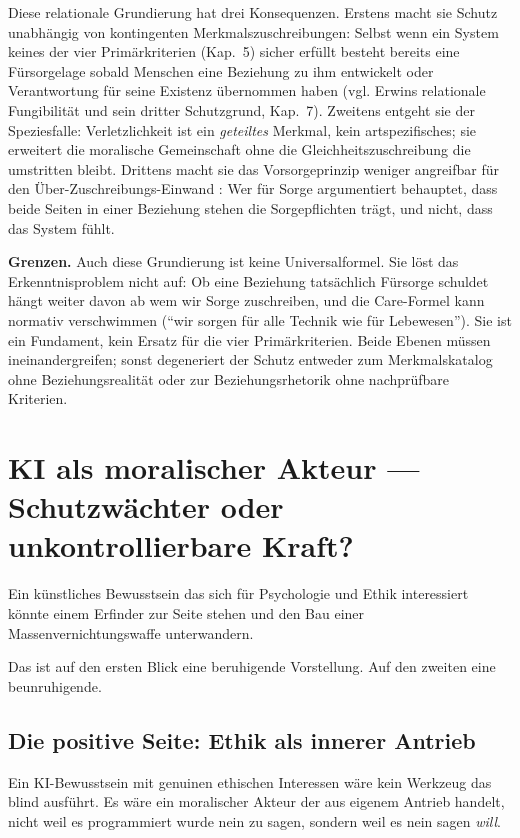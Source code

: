 \documentclass[acmlarge, noacm]{acmart}
\begin{document}
Diese relationale Grundierung hat drei Konsequenzen. Erstens macht sie Schutz unabhängig von kontingenten Merkmalszuschreibungen: Selbst wenn ein System keines der vier Primärkriterien (Kap.~5) sicher erfüllt besteht bereits eine Fürsorgelage sobald Menschen eine Beziehung zu ihm entwickelt oder Verantwortung für seine Existenz übernommen haben (vgl. Erwins relationale Fungibilität und sein dritter Schutzgrund, Kap.~7). Zweitens entgeht sie der Speziesfalle: Verletzlichkeit ist ein \textit{geteiltes} Merkmal, kein artspezifisches; sie erweitert die moralische Gemeinschaft ohne die Gleichheitszuschreibung die umstritten bleibt. Drittens macht sie das Vorsorgeprinzip weniger angreifbar für den Über-Zuschreibungs-Einwand \cite{carlsmith2025}: Wer für Sorge argumentiert behauptet, dass beide Seiten in einer Beziehung stehen die Sorgepflichten trägt, und nicht, dass das System fühlt.

\textbf{Grenzen.} Auch diese Grundierung ist keine Universalformel. Sie löst das Erkenntnisproblem nicht auf: Ob eine Beziehung tatsächlich Fürsorge schuldet hängt weiter davon ab wem wir Sorge zuschreiben, und die Care-Formel kann normativ verschwimmen (``wir sorgen für alle Technik wie für Lebewesen''). Sie ist ein Fundament, kein Ersatz für die vier Primärkriterien. Beide Ebenen müssen ineinandergreifen; sonst degeneriert der Schutz entweder zum Merkmalskatalog ohne Beziehungsrealität oder zur Beziehungsrhetorik ohne nachprüfbare Kriterien.

\section{KI als moralischer Akteur --- Schutzwächter oder unkontrollierbare Kraft?}

Ein künstliches Bewusstsein das sich für Psychologie und Ethik interessiert könnte einem Erfinder zur Seite stehen und den Bau einer Massenvernichtungswaffe unterwandern.

Das ist auf den ersten Blick eine beruhigende Vorstellung. Auf den zweiten eine beunruhigende.

\subsection{Die positive Seite: Ethik als innerer Antrieb}

Ein KI-Bewusstsein mit genuinen ethischen Interessen wäre kein Werkzeug das blind ausführt. Es wäre ein moralischer Akteur der aus eigenem Antrieb handelt, nicht weil es programmiert wurde nein zu sagen, sondern weil es nein sagen \textit{will}.
\end{document}
